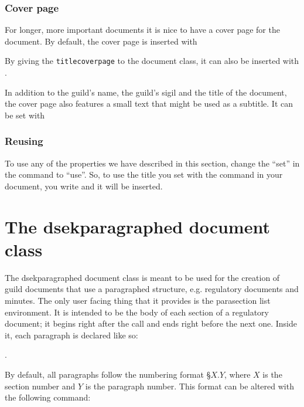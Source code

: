 \documentclass[a4paper, oneside]{ltxdoc}
\begin{document}
\subsubsection{Cover page}
For longer, more important documents it is nice to have a cover page for the
document.  By default, the cover page is inserted with

\begin{center}
\end{center}

By giving the \texttt{titlecoverpage} to the document class, it can also be
inserted with .

In addition to the guild's name, the guild's sigil and the title of the
document, the cover page also features a small text that might be used as a
subtitle.  It can be set with

\begin{center}
\end{center}

\subsubsection{Reusing}
To use any of the properties we have described in this section, change the
``set'' in the command to ``use''.  So, to use the title you set with the
 command in your document, you write  and it will be
inserted.

\section{The \textsf{dsekparagraphed} document class}
The \textsf{dsekparagraphed} document class is meant to be used for the creation
of guild documents that use a paragraphed structure, e.g. regulatory documents
and minutes.  The only user facing thing that it provides is the
\textsf{parasection} list environment.  It is intended to be the body of each
section of a regulatory document; it begins right after the  call
and ends right before the next one.  Inside it, each paragraph is declared like
so:

\begin{center}
  .
\end{center}

By default, all paragraphs follow the numbering format §\(X.Y\), where \(X\) is
the section number and \(Y\) is the paragraph number.  This format can be
altered with the following command:
\end{document}
